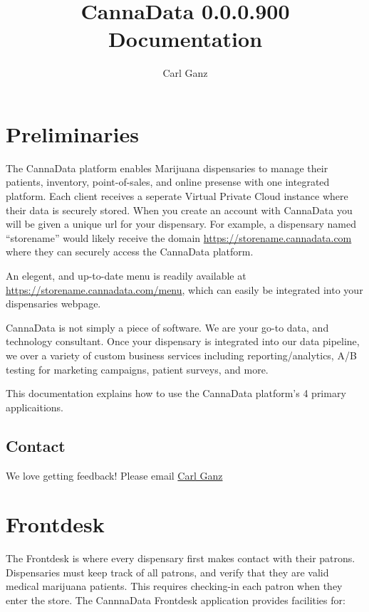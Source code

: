 \documentclass[]{book}
\title{CannaData 0.0.0.900 Documentation}
\author{Carl Ganz}
\date{}
\theoremstyle{definition}
\theoremstyle{definition}
\theoremstyle{definition}
\theoremstyle{remark}
\begin{document}
\maketitle

{
\setcounter{tocdepth}{1}
\tableofcontents
}
\chapter{Preliminaries}\label{preliminaries}

The CannaData platform enables Marijuana dispensaries to manage their
patients, inventory, point-of-sales, and online presense with one
integrated platform. Each client receives a seperate Virtual Private
Cloud instance where their data is securely stored. When you create an
account with CannaData you will be given a unique url for your
dispensary. For example, a dispensary named ``storename'' would likely
receive the domain \url{https://storename.cannadata.com} where they can
securely access the CannaData platform.

An elegent, and up-to-date menu is readily available at
\url{https://storename.cannadata.com/menu}, which can easily be
integrated into your dispensaries webpage.

CannaData is not simply a piece of software. We are your go-to data, and
technology consultant. Once your dispensary is integrated into our data
pipeline, we over a variety of custom business services including
reporting/analytics, A/B testing for marketing campaigns, patient
surveys, and more.

This documentation explains how to use the CannaData platform's 4
primary applicaitions.

\section{Contact}\label{contact}

We love getting feedback! Please email
\href{mailto:carl@cannadatasolutions.com}{Carl Ganz}

\chapter{Frontdesk}\label{frontdesk}

The Frontdesk is where every dispensary first makes contact with their
patrons. Dispensaries must keep track of all patrons, and verify that
they are valid medical marijuana patients. This requires checking-in
each patron when they enter the store. The CannnaData Frontdesk
application provides facilities for:
\end{document}
